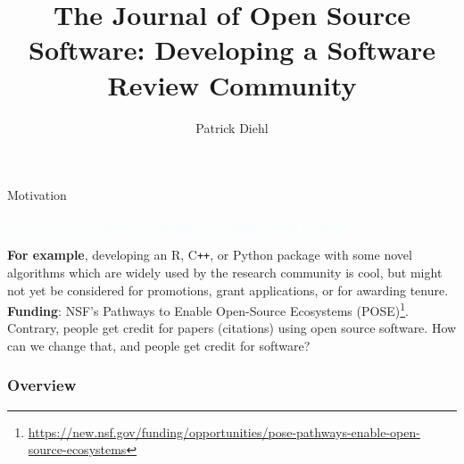 \documentclass{beamer}
\title[JOSS]{The Journal of Open Source Software: Developing a Software Review Community} %
\author{Patrick Diehl}
\institute[LANL] %
{
Applied Computer Science \\ Los Alamos National Laboratory \\ Department of Physics and Astronomy \\ Louisiana State University \\ %
\medskip
\textit{diehlpk@lanl.gov} \\ %
\vspace{0.25cm}
\tiny LA-UR-24-31426
}
\begin{document}
\begin{frame}
\titlepage
\end{frame}

\begin{frame}{Motivation}

\begin{center}
    \textcolor{azure}{(Open source) software is essential for computational sciences}
\end{center}

\textbf{For example}, developing an R, C\texttt{++}, or Python package with some novel algorithms which are widely used by the research community is cool, but might not yet be considered for promotions, grant applications, or for awarding tenure. \\
\vspace{0.25cm}
\textbf{Funding}: NSF's Pathways to Enable Open-Source Ecosystems (POSE)\footnote{\tiny\url{https://new.nsf.gov/funding/opportunities/pose-pathways-enable-open-source-ecosystems}}. \\
\vspace{0.25cm}
\textcolor{awesome}{Contrary}, people get credit for papers (citations) using open source software. How can we change that, and people get credit for software?  
\end{frame}

\begin{frame}
\frametitle{Overview} %
\tableofcontents %
\end{frame}



%
\end{document}
